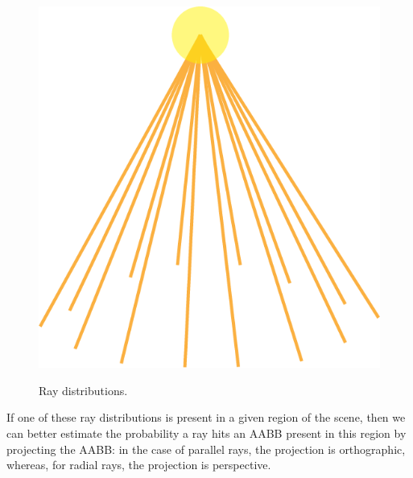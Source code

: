 \documentclass[11pt,a4paper,twocolumn]{article}
\begin{document}
\begin{figure}[H]
{        \includegraphics[width=\textwidth*\real{0.15}]{Images/point_light_rays.png} 
    }
    \caption{Ray distributions.}
    \label{fig:ray_distributions}
\end{figure} 

If one of these ray distributions is present in a given region of the scene, then we can better estimate the probability a ray hits an AABB present in this region by projecting the AABB: in the case of parallel rays, the projection is orthographic, whereas, for radial rays, the projection is perspective.
\end{document}

